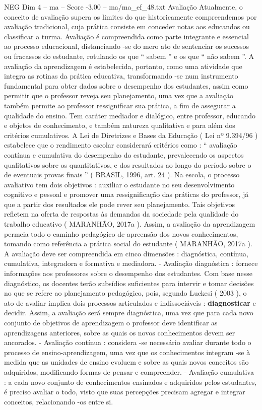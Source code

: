 \begin{textsample}{NEG Dim 4 – ma – Score -3.00 – ma/ma\_ef\_48.txt}  \label{ex:f4_neg_234}
Avaliação Atualmente, o conceito de avaliação supera os limites do que historicamente compreendemos por avaliação tradicional, cuja prática consiste em conceder notas aos educandos ou classificar a turma.
Avaliação é compreendida como parte integrante e essencial ao processo educacional, distanciando -se do mero ato de sentenciar os sucessos ou fracassos do estudante, rotulando os que “ sabem ” e os que “ não sabem ”.
A avaliação da aprendizagem é estabelecida, portanto, como uma atividade que integra as rotinas da prática educativa, transformando -se num instrumento fundamental para obter dados sobre o desempenho dos estudantes, assim como permitir que o professor reveja seu planejamento, uma vez que a avaliação também permite ao professor ressignificar sua prática, a fim de assegurar a qualidade do ensino.
Tem caráter mediador e dialógico, entre professor, educando e objetos de conhecimento, e também natureza qualitativa e para além dos critérios cumulativos.
A Lei de Diretrizes e Bases da Educação ( Lei nº 9.394/96 ) estabelece que o rendimento escolar considerará critérios como : “ avaliação contínua e cumulativa do desempenho do estudante, prevalecendo os aspectos qualitativos sobre os quantitativos, e dos resultados ao longo do período sobre o de eventuais provas finais ” ( BRASIL, 1996, art. 24 ).
Na escola, o processo avaliativo tem dois objetivos : auxiliar o estudante no seu desenvolvimento cognitivo e pessoal e promover uma ressignificação das práticas do professor, já que a partir dos resultados ele pode rever seu planejamento.
Tais objetivos refletem na oferta de respostas às demandas da sociedade pela qualidade do trabalho educativo ( MARANHÃO, 2017a ).
Assim, a avaliação da aprendizagem permeia todo o caminho pedagógico de apreensão dos novos conhecimentos, tomando como referência a prática social do estudante ( MARANHÃO, 2017a ).
A avaliação deve ser compreendida em cinco dimensões : diagnóstica, contínua, cumulativa, integradora e formativa e mediadora. - Avaliação diagnóstica : fornece informações aos professores sobre o desempenho dos estudantes.
Com base nesse diagnóstico, os docentes terão subsídios suficientes para intervir e tomar decisões no que se refere ao planejamento pedagógico, pois, segundo Luckesi ( 2003 ), o ato de avaliar implica dois processos articulados e indissociáveis : \textbf{diagnosticar} e decidir.
Assim, a avaliação será sempre diagnóstica, uma vez que para cada novo conjunto de objetivos de aprendizagem o professor deve identificar as aprendizagens anteriores, sobre as quais os novos conhecimentos devem ser ancorados. - Avaliação contínua : considera -se necessário avaliar durante todo o processo de ensino-aprendizagem, uma vez que os conhecimentos integram -se à medida que as unidades de ensino evoluem e sobre as quais novos conceitos são adquiridos, modificando formas de pensar e compreender. - Avaliação cumulativa : a cada novo conjunto de conhecimentos ensinados e adquiridos pelos estudantes, é preciso avaliar o todo, visto que suas percepções precisam agregar e integrar conceitos, relacionando -os entre si.

\end{textsample}
